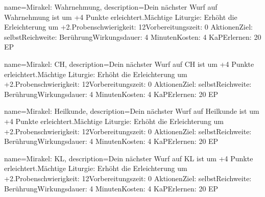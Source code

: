 {
    name={Mirakel: Wahrnehmung},
    description={Dein nächster Wurf auf Wahrnehmung ist um +4 Punkte erleichtert.\newline Mächtige Liturgie: Erhöht die Erleichterung um +2.\newline Probenschwierigkeit: 12\newline Vorbereitungszeit: 0 Aktionen\newline Ziel: selbst\newline Reichweite: Berührung\newline Wirkungsdauer: 4 Minuten\newline Kosten: 4 KaP\newline Erlernen: 20 EP}
}


{
    name={Mirakel: CH},
    description={Dein nächster Wurf auf CH ist um +4 Punkte erleichtert.\newline Mächtige Liturgie: Erhöht die Erleichterung um +2.\newline Probenschwierigkeit: 12\newline Vorbereitungszeit: 0 Aktionen\newline Ziel: selbst\newline Reichweite: Berührung\newline Wirkungsdauer: 4 Minuten\newline Kosten: 4 KaP\newline Erlernen: 20 EP}
}


{
    name={Mirakel: Heilkunde},
    description={Dein nächster Wurf auf Heilkunde ist um +4 Punkte erleichtert.\newline Mächtige Liturgie: Erhöht die Erleichterung um +2.\newline Probenschwierigkeit: 12\newline Vorbereitungszeit: 0 Aktionen\newline Ziel: selbst\newline Reichweite: Berührung\newline Wirkungsdauer: 4 Minuten\newline Kosten: 4 KaP\newline Erlernen: 20 EP}
}


{
    name={Mirakel: KL},
    description={Dein nächster Wurf auf KL ist um +4 Punkte erleichtert.\newline Mächtige Liturgie: Erhöht die Erleichterung um +2.\newline Probenschwierigkeit: 12\newline Vorbereitungszeit: 0 Aktionen\newline Ziel: selbst\newline Reichweite: Berührung\newline Wirkungsdauer: 4 Minuten\newline Kosten: 4 KaP\newline Erlernen: 20 EP}
}


